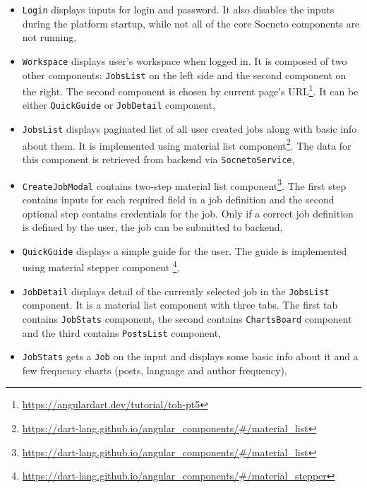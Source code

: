 \begin{itemize}
    \item \texttt{Login} displays inputs for login and password. It also disables the inputs during the platform startup, while not all of the core Socneto components are not running,
    
    \item \texttt{Workspace} displays user's workspace when logged in. It is composed of two other components: \texttt{JobsList} on the left side and the second component on the right. The second component is chosen by current page's URL\footnote{\url{https://angulardart.dev/tutorial/toh-pt5}}. It can be either \texttt{QuickGuide} or \texttt{JobDetail} component,
    
    \item \texttt{JobsList} displays paginated list of all  user created jobs along with basic info about them. It is implemented using material list component\footnote{\url{https://dart-lang.github.io/angular\_components/\#/material\_list}}. The data for this component is retrieved from backend via \texttt{SocnetoService},
    
    \item \texttt{CreateJobModal} contains two-step material list component\footnote{\url{https://dart-lang.github.io/angular\_components/\#/material\_list}}. The first step contains inputs for each required field in a job definition and the second optional step contains credentials for the job. Only if a correct job definition is defined by the user, the job can be submitted to backend,
    
    \item \texttt{QuickGuide} displays a simple guide for the user. The guide is implemented using material stepper component \footnote{\url{https://dart-lang.github.io/angular_components/\#/material\_stepper}},
    
    \item \texttt{JobDetail} displays detail of the currently selected job in the \texttt{JobsList} component. It is a material list component with three tabs. The first tab contains \texttt{JobStats} component, the second contains \texttt{ChartsBoard} component and the third contains \texttt{PostsList} component,
    
    \item \texttt{JobStats} gets a \texttt{Job} on the input and displays some basic info about it and a few frequency charts (posts, language and author frequency),
    

\end{itemize}
